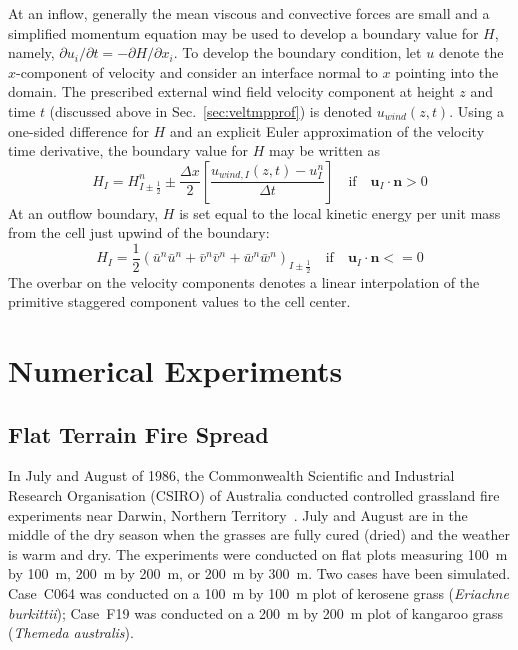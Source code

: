\documentclass[journal,article,atmosphere,submit,moreauthors,pdftex]{Definitions/mdpi}
\begin{document}
At an inflow, generally the mean viscous and convective forces are small and a simplified momentum equation   may be used to develop a boundary value for $H$, namely, $\partial u_i/\partial t = -\partial H/\partial x_i$. To develop the boundary condition, let $u$ denote the $x$-component of velocity and consider an interface normal to $x$ pointing into the domain.  The prescribed external wind field velocity component at height $z$ and time $t$ (discussed above in Sec.~\ref{sec:veltmpprof}) is denoted $u_{wind}(z,t)$.  Using a one-sided difference for $H$ and an explicit Euler approximation of the velocity time derivative, the boundary value for $H$ may be written as 
\begin{equation}
\label{eq:Hin}
H_I = H_{I\pm\frac{1}{2}}^n \pm \frac{\Delta x}{2}\left[\frac{u_{wind,I}(z,t) - u_I^n}{\Delta t}\right] \quad \mbox{if} \quad \mathbf{u}_I\cdot\mathbf{n}>0
\end{equation}
At an outflow boundary, $H$ is set equal to the local kinetic energy per unit mass from the cell just upwind of the boundary:
\begin{equation}
\label{eq:Hout}
H_I = \frac{1}{2}(\bar{u}^n \bar{u}^n + \bar{v}^n \bar{v}^n + \bar{w}^n \bar{w}^n)_{I\pm\frac{1}{2}} \quad \mbox{if} \quad \mathbf{u}_I\cdot\mathbf{n}<=0
\end{equation}
The overbar on the velocity components denotes a linear interpolation of the primitive staggered component values to the cell center.

\section{Numerical Experiments} \label{sec:numexp}


\subsection{Flat Terrain Fire Spread}  \label{sec:simexp}

In July and August of 1986, the Commonwealth Scientific and Industrial Research Organisation (CSIRO) of Australia conducted controlled grassland fire experiments near Darwin, Northern Territory~\cite{Cheney:IJWF1993}. July and August are in the middle of the dry season when the grasses are fully cured (dried) and the weather is warm and dry. The experiments were conducted on flat plots measuring 100~m by 100~m, 200~m by 200~m, or 200~m by 300~m. Two cases have been simulated. Case~C064 was conducted on a 100~m by 100~m plot of kerosene grass ({\it Eriachne burkittii}); Case~F19 was conducted on a 200~m by 200~m plot of kangaroo grass ({\it Themeda australis}).
\end{document}
